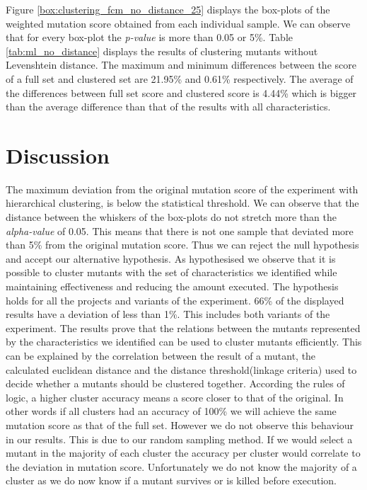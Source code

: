 \documentclass[conference,draftclsnofoot,onecolumn]{IEEEtran}
\begin{document}
Figure \ref{box:clustering_fcm_no_distance_25} displays the box-plots of the weighted mutation score obtained from each individual sample. 
We can observe that for every box-plot the \textit{p-value} is more than 0.05 or 5\%.
Table \ref{tab:ml_no_distance} displays the results of clustering mutants without Levenshtein distance.
The maximum and minimum differences between the score of a full set and clustered set are 21.95\% and 0.61\% respectively.
The average of the differences between full set score and clustered score is 4.44\% which is bigger than the average difference than that of the results with all characteristics.

\section{Discussion}
The maximum deviation from the original mutation score of the experiment with hierarchical clustering, is below the statistical threshold.
We can observe that the distance between the whiskers of the box-plots do not stretch more than the \textit{alpha-value} of 0.05.
This means that there is not one sample that deviated more than 5\% from the original mutation score.
Thus we can reject the null hypothesis and accept our alternative hypothesis.
As hypothesised we observe that it is possible to cluster mutants with the set of characteristics we identified while maintaining effectiveness and reducing the amount executed.
The hypothesis holds for all the projects and variants of the experiment.
66\% of the displayed results have a deviation of less than 1\%. 
This includes both variants of the experiment.
\newline
The results prove that the relations between the mutants represented by the characteristics we identified can be used to cluster mutants efficiently. 
This can be explained by the correlation between the result of a mutant, the calculated euclidean distance and the distance threshold(linkage criteria) used to decide whether a mutants should be clustered together.
\newline
According the rules of logic, a higher cluster accuracy means a score closer to that of the original.
In other words if all clusters had an accuracy of 100\% we will achieve the same mutation score as that of the full set.
However we do not observe this behaviour in our results.
This is due to our random sampling method.
If we would select a mutant in the majority of each cluster the accuracy per cluster would correlate to the deviation in mutation score.
Unfortunately we do not know the majority of a cluster as we do now know if a mutant survives or is killed before execution.
\end{document}
